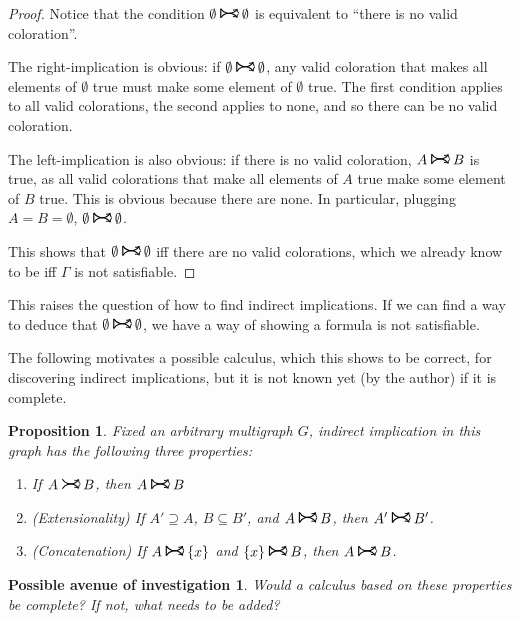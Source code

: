 \documentclass[11pt]{article}
\newcommand{\rightcurvearrow}{
\mathrel{
  \begin{tikzpicture}[scale=0.8]
    \draw[thick,->] (0,1ex) arc (30:150:-2ex);
    \draw[thick,->] (0,-1ex) arc (150:30:2ex);
  \end{tikzpicture}
}
}
\newcommand{\Rightcurvearrow}{
\mathrel{
  \begin{tikzpicture}[scale=0.8]
    \draw[thick,->] (0,1ex) arc (30:150:-2ex);
    \draw[thick,->] (0,-1ex) arc (150:30:2ex);
    \draw[thick] (0, 1ex) -- (0, -1ex);
  \end{tikzpicture}
}
}
\newtheorem{prop}{Proposition}
\newtheorem*{av}{Possible avenue of investigation}
\begin{document}
\begin{proof}
Notice that the condition $\emptyset \Rightcurvearrow \emptyset$ is equivalent to ``there is no valid coloration''.

The right-implication is obvious: if $\emptyset \Rightcurvearrow \emptyset$, any valid coloration that makes all elements of $\emptyset$ true must make some element of $\emptyset$ true. The first condition applies to all valid colorations, the second applies to none, and so there can be no valid coloration.

The left-implication is also obvious: if there is no valid coloration, $A \Rightcurvearrow B$ is true, as all valid colorations that make all elements of $A$ true make some element of $B$ true. This is obvious because there are none. In particular, plugging $A = B = \emptyset$, $\emptyset \Rightcurvearrow \emptyset$.

This shows that $\emptyset \Rightcurvearrow \emptyset$ iff there are no valid colorations, which we already know to be iff $\Gamma$ is not satisfiable.
\end{proof}

This raises the question of how to find indirect implications. If we can find a way to deduce that $\emptyset \Rightcurvearrow \emptyset$, we have a way of showing a formula is not satisfiable.

The following motivates a possible calculus, which this shows to be correct, for discovering indirect implications, but it is not known yet (by the author) if it is complete.

\begin{prop}
Fixed an arbitrary multigraph $G$, indirect implication in this graph has the following three properties:

\begin{enumerate}[i]
\item If $A \rightcurvearrow B$, then $A \Rightcurvearrow B$
\item (Extensionality) If $A' \supseteq A$, $B \subseteq B'$, and $A \Rightcurvearrow B$, then $A' \Rightcurvearrow B'$.
\item (Concatenation) If $A \Rightcurvearrow \{x\}$ and $\{x\} \Rightcurvearrow B$, then $A \Rightcurvearrow B$.
\end{enumerate}
\end{prop}

\begin{av}
Would a calculus based on these properties be complete? If not, what needs to be added?
\end{av}
\end{document}
